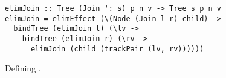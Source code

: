 \begin{wrapfigure}{r}{0.6\textwidth}
\vspace{-0.3cm}
\begin{ccodebox}
\begin{lstlisting}[style=haskell]
elimJoin :: Tree (Join ': s) p n v -> Tree s p n v
elimJoin = elimEffect (\(Node (Join l r) child) ->
  bindTree (elimJoin l) (\lv ->
    bindTree (elimJoin r) (\rv ->
      elimJoin (child (trackPair (lv, rv))))))
\end{lstlisting}
\end{ccodebox}
\vspace{-0.4cm}
\caption{Defining .}
\vspace{-0.4cm}
\end{wrapfigure}
